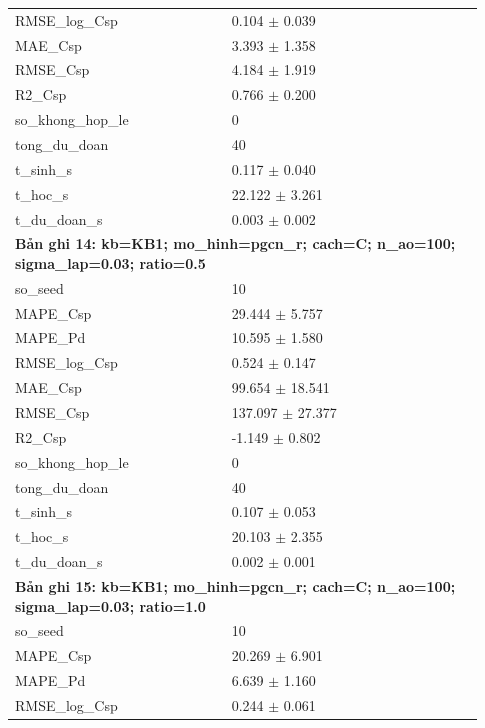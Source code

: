 \begin{longtable}{p{0.43\linewidth}p{0.50\linewidth}}
RMSE\_\allowbreak log\_\allowbreak Csp & 0.104 $\pm$ 0.039 \\
MAE\_\allowbreak Csp & 3.393 $\pm$ 1.358 \\
RMSE\_\allowbreak Csp & 4.184 $\pm$ 1.919 \\
R2\_\allowbreak Csp & 0.766 $\pm$ 0.200 \\
so\_\allowbreak khong\_\allowbreak hop\_\allowbreak le & 0 \\
tong\_\allowbreak du\_\allowbreak doan & 40 \\
t\_\allowbreak sinh\_\allowbreak s & 0.117 $\pm$ 0.040 \\
t\_\allowbreak hoc\_\allowbreak s & 22.122 $\pm$ 3.261 \\
t\_\allowbreak du\_\allowbreak doan\_\allowbreak s & 0.003 $\pm$ 0.002 \\
\midrule
\multicolumn{2}{p{0.95\linewidth}}{\textbf{Bản ghi 14: kb=KB1; mo\_hinh=pgcn\_r; cach=C; n\_ao=100; sigma\_lap=0.03; ratio=0.5}} \\
so\_\allowbreak seed & 10 \\
MAPE\_\allowbreak Csp & 29.444 $\pm$ 5.757 \\
MAPE\_\allowbreak Pd & 10.595 $\pm$ 1.580 \\
RMSE\_\allowbreak log\_\allowbreak Csp & 0.524 $\pm$ 0.147 \\
MAE\_\allowbreak Csp & 99.654 $\pm$ 18.541 \\
RMSE\_\allowbreak Csp & 137.097 $\pm$ 27.377 \\
R2\_\allowbreak Csp & -1.149 $\pm$ 0.802 \\
so\_\allowbreak khong\_\allowbreak hop\_\allowbreak le & 0 \\
tong\_\allowbreak du\_\allowbreak doan & 40 \\
t\_\allowbreak sinh\_\allowbreak s & 0.107 $\pm$ 0.053 \\
t\_\allowbreak hoc\_\allowbreak s & 20.103 $\pm$ 2.355 \\
t\_\allowbreak du\_\allowbreak doan\_\allowbreak s & 0.002 $\pm$ 0.001 \\
\midrule
\multicolumn{2}{p{0.95\linewidth}}{\textbf{Bản ghi 15: kb=KB1; mo\_hinh=pgcn\_r; cach=C; n\_ao=100; sigma\_lap=0.03; ratio=1.0}} \\
so\_\allowbreak seed & 10 \\
MAPE\_\allowbreak Csp & 20.269 $\pm$ 6.901 \\
MAPE\_\allowbreak Pd & 6.639 $\pm$ 1.160 \\
RMSE\_\allowbreak log\_\allowbreak Csp & 0.244 $\pm$ 0.061 \\

\end{longtable}

